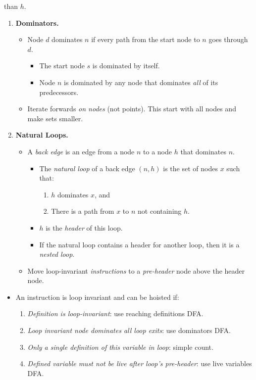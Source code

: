 \documentclass[twocolumn,english]{article}
\begin{document}
\begin{enumerate}
\begin{itemize}
\begin{enumerate}
than $h$.
\end{enumerate}
\end{itemize}
\begin{enumerate}
\item \textbf{Dominators.}
\begin{itemize}
\item Node $d$ dominates $n$ if every path from the start node to $n$
goes through $d$.
\begin{itemize}
\item The start node $s$ is dominated by itself.
\item Node $n$ is dominated by any node that dominates \emph{all} of its
predecessors.
\end{itemize}
\item Iterate forwards \emph{on nodes} (not points). This start with all
nodes and make sets smaller.
\end{itemize}
\item \textbf{Natural Loops.}
\begin{itemize}
\item A \emph{back edge} is an edge from a node $n$ to a node $h$ that
dominates $n$.
\begin{itemize}
\item The \emph{natural loop} of a back edge $\left(n,h\right)$ is the
set of nodes $x$ such that:
\begin{enumerate}
\item $h$ dominates $x$, and
\item There is a path from $x$ to $n$ not containing $h$.
\end{enumerate}
\item $h$ is the \emph{header} of this loop.
\item If the natural loop contains a header for another loop, then it is
a \emph{nested loop}.
\end{itemize}
\item Move loop-invariant \emph{instructions} to a \emph{pre-header} node
above the header node.
\end{itemize}
\end{enumerate}
\begin{itemize}
\item An instruction is loop invariant and can be hoisted if:
\begin{enumerate}
\item \emph{Definition is loop-invariant}: use reaching definitions DFA.
\item \emph{Loop invariant node dominates all loop exits}: use dominators
DFA.
\item \emph{Only a single definition of this variable in loop}: simple count.
\item \emph{Defined variable must not be live after loop's pre-header}:
use live variables DFA.
\end{enumerate}
\end{itemize}
\end{enumerate}
\end{document}
